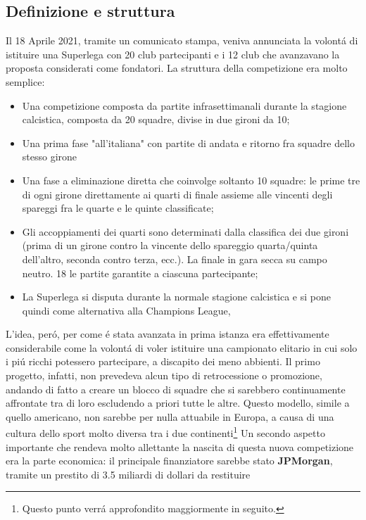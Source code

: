 \documentclass[
    corpo=12pt,
    oneside,
    evenboxes,
    tipotesi=triennale,
    stile=classica,
    oldstyle,
    autoretitolo,
    greek,
]{toptesi}
\begin{document}
\begin{interlinea}{1.5}
\section{Definizione e struttura}
Il 18 Aprile 2021, tramite un comunicato stampa, veniva annunciata la volont\'a di istituire una Superlega con 20 club partecipanti e i 12 club
che avanzavano la proposta considerati come fondatori. La struttura della competizione era molto semplice: 
\begin{itemize}
    \item Una competizione composta da partite infrasettimanali durante la stagione calcistica, composta da 20 squadre, divise in due gironi da 10;
    \item Una prima fase "all’italiana" con partite di andata e ritorno fra squadre dello stesso girone
    \item Una fase a eliminazione diretta che coinvolge soltanto 10 squadre: le prime tre di ogni 
    girone direttamente ai quarti di finale assieme alle vincenti degli spareggi fra le quarte e le quinte classificate;
    \item Gli accoppiamenti dei quarti sono determinati dalla classifica dei due gironi (prima di un girone contro la vincente 
    dello spareggio quarta/quinta dell’altro, seconda contro terza, ecc.). La finale in gara secca su campo neutro. 
    18 le partite garantite a ciascuna partecipante;
    \item La Superlega si disputa durante la normale stagione calcistica e si pone quindi come alternativa alla Champions League, 
\end{itemize}
L'idea, per\'o, per come \'e stata avanzata in prima istanza era effettivamente considerabile come la volont\'a di voler istituire 
una campionato elitario in cui solo i pi\'u ricchi potessero partecipare, a discapito dei meno abbienti. Il primo progetto, infatti, non prevedeva
alcun tipo di retrocessione o promozione, andando di fatto a creare un blocco di squadre che si sarebbero continuamente affrontate tra di loro
escludendo a priori tutte le altre. Questo modello, simile a quello americano, non sarebbe per nulla attuabile in Europa, a causa di una cultura dello sport molto diversa tra i due continenti\footnote{Questo punto verr\'a approfondito maggiormente in seguito.}\newline
Un secondo aspetto importante che rendeva molto allettante la nascita di questa nuova competizione
era la parte economica: il principale finanziatore sarebbe stato \textbf{JPMorgan}, tramite un prestito di 3.5 miliardi di dollari da restituire

\end{interlinea}
\end{document}
